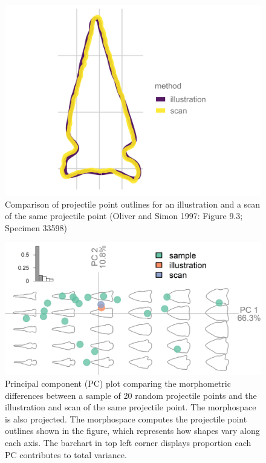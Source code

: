 \documentclass[letterpaper]{article}
\begin{document}
\begin{figure}
\includegraphics[width=1\linewidth]{figures/pointComparison} \caption{Comparison of projectile point outlines for an illustration and a scan of the same projectile point (Oliver and Simon 1997: Figure 9.3; Specimen 33598)}\label{fig:pointComparison}
\end{figure}

\begin{figure}
\includegraphics[width=1\linewidth]{figures/comparisonPCA} \caption{Principal component (PC) plot comparing the morphometric differences between a sample of 20 random projectile points and the illustration and scan of the same projectile point. The morphospace is also projected. The morphospace computes the projectile point outlines shown in the figure, which represents how shapes vary along each axis. The barchart in top left corner displays proportion each PC contributes to total variance.}\label{fig:comparisonPCA}
\end{figure}
\end{document}
